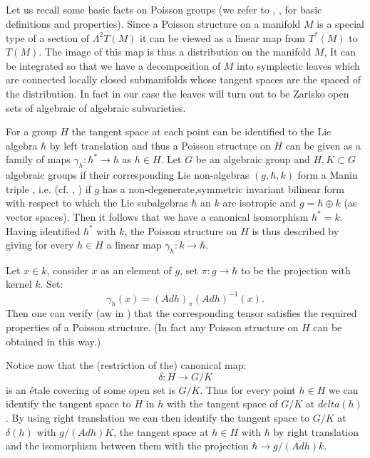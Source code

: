 \subsection{}\label{art4-subsec-4.2}
Let us recall some basic facts on Poisson groups (we refer to \cite{art4-keyD}, \cite{art4-keySTS}, \cite{art4-keyLW} for basic definitions and properties). Since a Poisson structure on a manifold $M$  is a special type of a section of
$\Lambda^{2}T(M)$ it can be viewed as a linear map from $T^{*}(M)$ to $T(M)$. The image of this map is thus a distribution on the manifold $M$, It can be integrated so that we have a decomposition of $M$ into symplectic leaves which are connected locally closed submanifolds whose tangent spaces are the spaced of the distribution. In fact in our case the leaves will turn out to be Zarisko open sets of algebraic of algebraic subvarieties.

For a group $H$ the tangent space at each point can be identified to the Lie algebra $\hbar$ by left translation and thus a Poisson structure on $H$ can be given as a family of maps $\gamma_{h} : \hbar^{*} \rightarrow \hbar$ as $h \in H$. Let $G$ be an algebraic group and $H, K \subset G$ algebraic groups if their corresponding Lie non-algebras $(g, \hbar, k)$
form a Manin triple , i.e. (cf. \cite{art4-keyD}, \cite{art4-keyLW}) if $g$ has a non-degenerate,symmetric invariant bilinear form with respect to which the Lie subalgebras $\hbar$ an $k$ are isotropic and $g=\hbar \oplus k$ (as vector spaces). Then it follows that we have a canonical isomorphism $\hbar^{*} =k$. Having identified $\hbar^{*}$ with $k$, the Poisson structure on $H$ is thus described by giving for every $h\in H $ a linear map $\gamma_{h} : k \rightarrow \hbar$.  

Let $x\in k$, consider $x$ as an element of $g$, set $\pi : g \rightarrow \hbar$ to be the projection with kernel $k$. Set:
$$
\gamma_{h}(x) = (Adh)_{\pi}(Adh)^{-1}(x).
$$
Then one can verify (aw in \cite{art4-keyLW}) that the corresponding tensor satisfies the required properties of a Poisson structure. (In fact any Poisson structure on $H$ can be obtained in this way.)

Notice now that the (restriction of the) canonical map:
$$
\delta: H\rightarrow G/K
$$
is an \'etale covering of some open set is $G/K$. Thus for every point $h\in H$ we can identify the tangent space to $H$ in $h$ with the tangent space of $G/K$ at $delta(h)$. By using right translation we can then identify the tangent space to $G/K$ at $\delta(h)$ with $g/(Adh)K$, the tangent space at $h\in H$ with $\hbar$ by right translation and the isomorphism between them with the projection $\hbar \rightarrow g/(Adh)k$. 

